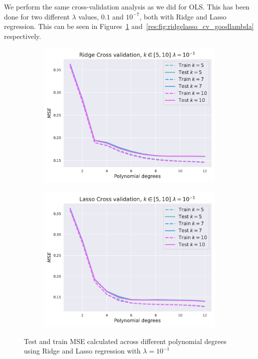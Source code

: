 \documentclass[twocolumn,english,notitlepage]{article}
\begin{document}
        We perform the same cross-validation analysis as we did for OLS. This has been done for two different $\lambda$ values, $0.1$ and $10^{-7}$, both with Ridge and Lasso regression. This can be seen in Figures~\ref{res:fig:ridgelasso_cv_badlambda} and~\ref{res:fig:ridgelasso_cv_goodlambda} respectively.
        \begin{figure}[ht]
            \begin{subfigure}{.9\linewidth}
                \centering
                \includegraphics[width=\linewidth]{bad_lmbda_Ridge_mse_kfold.pdf}
            \end{subfigure}
            \hfill
            \begin{subfigure}{.9\linewidth}
                \centering
                \includegraphics[width=\linewidth]{bad_lmbda_Lasso_mse_kfold.pdf}
            \end{subfigure}
            \caption{Test and train MSE calculated across different polynomial degrees using Ridge and Lasso regression with $\lambda = 10^{-1}$}
            \label{res:fig:ridgelasso_cv_badlambda}
        \end{figure}
\end{document}
